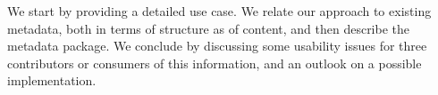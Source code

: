 We start by providing a detailed use case. We relate our approach to existing metadata, both in terms of structure as of content, and then describe the metadata package. We conclude by discussing some usability issues for three contributors or consumers of this information, and an outlook on a possible implementation.